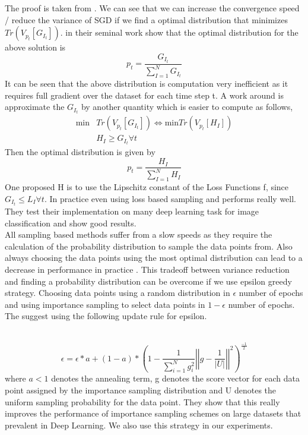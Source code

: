 \documentclass[a4paper,twoside]{iiththesis}
\theoremstyle{definition}
\theoremstyle{definition}
\theoremstyle{remark}
\begin{document}
The proof is taken from \cite{katharopoulos2018not}. We can see that we can increase the convergence speed / reduce the variance of SGD if we find a optimal distribution that  minimizes $ Tr(V_{p_t}[G_{I_t}])$.
\cite{zhao2015stochastic} in their seminal work show that the optimal distribution for the above solution is  
\begin{equation}
p_t = \frac{G_{I_t}} {\sum_{I=1}^N G_{I_t}}
\end{equation}
It can be seen that the above distribution is computation very inefficient as it requires full gradient over the dataset for each time step t. A work around is approximate the $G_{I_t}$ by another quantity which is easier to compute as follows, 
\begin{align}
\text{min} &Tr(V_{p_t}[G_{I_t}]) \iff \text{min} Tr(V_{p_t} [H_{I}])\\
& H_I \geq G_{I_t}  \forall t
\end{align}
Then the optimal distribution is given by 
\begin{equation}
p_t = \frac{H_{I}} {\sum_{I=1}^N H_{I}}
\end{equation}
One proposed H is to use the Lipschitz constant of the Loss Functions f, since $G_{I_t} \leq L_I \forall {t}$.
In practice even using loss based sampling \cite{loshchilov2015online} and \cite{katharopoulos2017biased} performs really well. They test their implementation on many deep learning task for image classification and show good results. \\
All sampling based methods suffer from a slow speeds as they require the calculation of the probability distribution to sample the data points from. Also always choosing the data points using the most optimal distribution can lead to a decrease in performance in practice \cite{katharopoulos2018not}. This tradeoff between variance reduction and finding a probability distribution can be overcome if we use epsilon greedy strategy. Choosing data points using a random distribution in $\epsilon$ number of epochs and using importance sampling to select data points in $1-\epsilon$ number of epochs. The suggest using the following update rule for epsilon.

\\\begin{equation}\label{Fixed Eps}
\epsilon  = \epsilon * a + (1-a) * \left(1 - \frac{1}{\sum_{i=1}^N g_{i}^2} \left | \left | g - \frac{1}{|U|} \right| \right|^2 \right)^\frac{-1}{2}
\end{equation}
where $a  < 1 $ denotes the annealing term, g denotes the score vector for each data point assigned by the importance sampling distribution and U denotes the uniform sampling probability for the data point. They show that this really improves the performance of importance sampling schemes on large datasets that prevalent in Deep Learning. We also use this strategy in our experiments.
\end{document}

